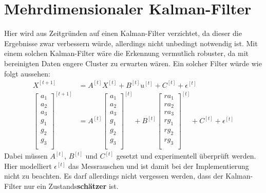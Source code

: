 \documentclass{article}
\begin{document}
\section{Mehrdimensionaler Kalman-Filter}
\label{sec:kalman}
Hier wird aus Zeitgründen auf einen Kalman-Filter verzichtet, da dieser die Ergebnisse zwar verbessern würde, allerdings nicht unbedingt notwendig ist.
Mit einem solchen Kalman-Filter wäre die Erkennung vermutlich robuster, da mit bereinigten Daten \glqq engere\grqq{} Cluster zu erwarten wären.
Ein solcher Filter würde wie folgt aussehen:
\begin{align*}
X^{[t+1]} &= A^{[t]}X^{[t]} + B^{[t]}u^{[t]} + C^{[t]} + \epsilon^{[t]}\\
\left[\begin{array}{r}
a_{1}\\
a_{2}\\
a_{3}\\
g_{1}\\
g_{2}\\
g_{3}\\
\end{array}\right]^{[t+1]}
&= A^{[t]} \left[\begin{array}{r}
a_{1}\\
a_{2}\\
a_{3}\\
g_{1}\\
g_{2}\\
g_{3}\\
\end{array}\right]^{[t]}
+ B^{[t]}\left[\begin{array}{r}
ra_{1}\\
ra_{2}\\
ra_{3}\\
rg_{1}\\
rg_{2}\\
rg_{3}\\
\end{array}\right]^{[t]}
+ C^{[t]} + \epsilon^{[t]}
\end{align*}
Dabei müssen $A^{[t]}$, $B^{[t]}$ und $C^{[t]}$ gesetzt und experimentell überprüft werden.
Hier modelliert $\epsilon^{[t]}$ das Messrauschen und ist damit bei der Implementierung nicht zu beachten.
Es darf allerdings nicht vergessen werden, dass der Kalman-Filter nur ein Zustands\textbf{schätzer} ist.

\newpage
\end{document}
